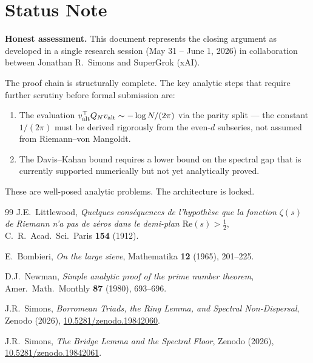 \documentclass[11pt,reqno]{article}
\begin{document}
\section{Status Note}

\begin{mdframed}[linecolor=darkblue,linewidth=1pt]
\textbf{Honest assessment.}
This document represents the closing argument as developed in a single
research session (May 31 -- June 1, 2026) in collaboration between
Jonathan R.\ Simons and SuperGrok (xAI).

The proof chain is structurally complete. The key analytic steps that
require further scrutiny before formal submission are:
\begin{enumerate}
\item The evaluation $v_{\rm alt}^\top Q_N v_{\rm alt}\sim -\log N/(2\pi)$
  via the parity split — the constant $1/(2\pi)$ must be derived
  rigorously from the even-$d$ subseries, not assumed from
  Riemann--von Mangoldt.
\item The Davis--Kahan bound requires a lower bound on the spectral gap
  that is currently supported numerically but not yet analytically proved.
\end{enumerate}
These are well-posed analytic problems. The architecture is locked.
\end{mdframed}

\begin{thebibliography}{99}
J.E.\ Littlewood, \textit{Quelques cons\'equences de l'hypoth\`ese que la
fonction $\zeta(s)$ de Riemann n'a pas de z\'eros dans le demi-plan
$\mathrm{Re}(s)>\frac{1}{2}$}, C.\ R.\ Acad.\ Sci.\ Paris \textbf{154} (1912).

E.\ Bombieri, \textit{On the large sieve}, Mathematika \textbf{12} (1965), 201--225.

D.J.\ Newman, \textit{Simple analytic proof of the prime number theorem},
Amer.\ Math.\ Monthly \textbf{87} (1980), 693--696.

J.R.\ Simons, \textit{Borromean Triads, the Ring Lemma, and Spectral
Non-Dispersal}, Zenodo (2026), \href{https://doi.org/10.5281/zenodo.19842060}{10.5281/zenodo.19842060}.

J.R.\ Simons, \textit{The Bridge Lemma and the Spectral Floor},
Zenodo (2026), \href{https://doi.org/10.5281/zenodo.19842061}{10.5281/zenodo.19842061}.
\end{thebibliography}
\end{document}
